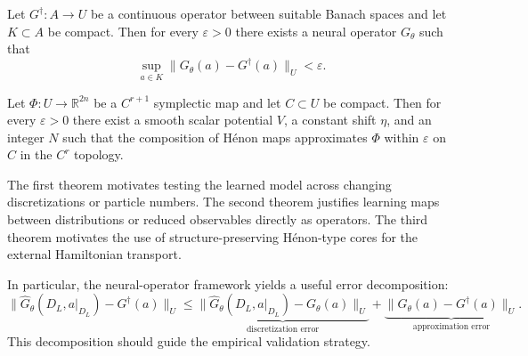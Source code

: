 \documentclass[11pt,a4paper]{article}
\begin{document}
\begin{sloppypar}
\begin{theorem}
Let $G^\dagger : A \to U$ be a continuous operator between suitable Banach spaces and let $K \subset A$ be compact. Then for every $\varepsilon>0$ there exists a neural operator $G_\theta$ such that
\begin{equation}
 \sup_{a\in K}
 \|G_\theta(a)-G^\dagger(a)\|_U < \varepsilon.
 \label{eq:theorem-universal-operator}
\end{equation}
\end{theorem}

\begin{theorem}
Let $\Phi : U \to \mathbb{R}^{2n}$ be a $C^{r+1}$ symplectic map and let $C\subset U$ be compact. Then for every $\varepsilon>0$ there exist a smooth scalar potential $V$, a constant shift $\eta$, and an integer $N$ such that the composition of H\'enon maps approximates $\Phi$ within $\varepsilon$ on $C$ in the $C^r$ topology.
\end{theorem}

The first theorem motivates testing the learned model across changing discretizations or particle numbers. The second theorem justifies learning maps between distributions or reduced observables directly as operators. The third theorem motivates the use of structure-preserving H\'enon-type cores for the external Hamiltonian transport.

In particular, the neural-operator framework yields a useful error decomposition:
\begin{equation}
 \|\widehat{G}_\theta(D_L,a|_{D_L}) - G^\dagger(a)\|_U
 \le
 \underbrace{\|\widehat{G}_\theta(D_L,a|_{D_L}) - G_\theta(a)\|_U}_{\text{discretization error}}
 +
 \underbrace{\|G_\theta(a)-G^\dagger(a)\|_U}_{\text{approximation error}}.
 \label{eq:error-decomposition}
\end{equation}
This decomposition should guide the empirical validation strategy.




\end{sloppypar}
\end{document}
